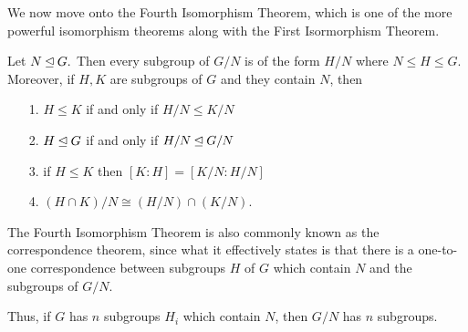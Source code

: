     We now move onto the Fourth Isomorphism Theorem, which is one of
    the more powerful isomorphism theorems along with the First
    Isormorphism Theorem. 

    \begin{thm}
        Let $N \unlhd G.$ Then every subgroup of $G/N$ is of the form
        $H/N$ where $N \le H \le G$. Moreover, if $H, K$ are subgroups
        of $G$ and they contain $N$, then 
        \begin{itemize}
            \item[1.] $H \le K$ if and only if $H/N \le K/N$
            \item[2.] $H \unlhd G$ if and only if $H/N \unlhd G/N$ 
            \item[3.] if $H \le K$ then $[K:H] = [K/N:H/N]$
            \item[4.] $(H \cap K)/N \cong (H/N) \cap (K/N)$.    
        \end{itemize} 
    \end{thm}
    

    \begin{minipage}{0.4\textwidth}
    \end{minipage}\hfill
    \begin{minipage}{0.55\textwidth}
        The Fourth Isomorphism Theorem is also commonly known as the
        correspondence theorem, since what it effectively states is that
        there is a one-to-one correspondence between subgroups $H$ of $G$
        which contain $N$ and the subgroups of $G/N$.

        Thus, if $G$ has $n$ subgroups $H_i$ which contain $N$, then $G/N$
        has $n$ subgroups.
    \end{minipage}


